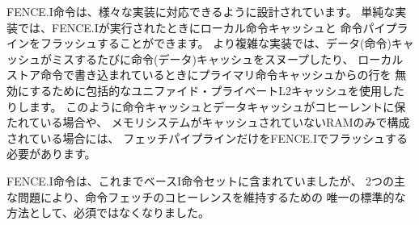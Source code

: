 \begin{commentary}
\begin{comment}
The FENCE.I instruction was designed to support a wide variety of
implementations.  A simple implementation can flush the local
instruction cache and the instruction pipeline when the FENCE.I is
executed.  A more complex implementation might snoop the instruction
(data) cache on every data (instruction) cache miss, or use an
inclusive unified private L2 cache to invalidate lines from the
primary instruction cache when they are being written by a local store
instruction.  If instruction and data caches are kept coherent in this
way, or if the memory system consists of only uncached RAMs, then just
the fetch pipeline needs to be flushed at a FENCE.I.
\end{comment}

FENCE.I命令は、様々な実装に対応できるように設計されています。 
単純な実装では、FENCE.Iが実行されたときにローカル命令キャッシュと
命令パイプラインをフラッシュすることができます。 
より複雑な実装では、データ(命令)キャッシュがミスするたびに命令(データ)キャッシュをスヌープしたり、
ローカルストア命令で書き込まれているときにプライマリ命令キャッシュからの行を
無効にするために包括的なユニファイド・プライベートL2キャッシュを使用したりします。 
このように命令キャッシュとデータキャッシュがコヒーレントに保たれている場合や、
メモリシステムがキャッシュされていないRAMのみで構成されている場合には、
フェッチパイプラインだけをFENCE.Iでフラッシュする必要があります。

\begin{comment}
The FENCE.I instruction was previously part of the base I instruction
set.  Two main issues are driving moving this out of the mandatory
base, although at time of writing it is still the only standard method
for maintaining instruction-fetch coherence.
\end{comment}

FENCE.I命令は、これまでベースI命令セットに含まれていましたが、
2つの主な問題により、命令フェッチのコヒーレンスを維持するための
唯一の標準的な方法として、必須ではなくなりました。

\begin{comment}
First, it has been recognized that on some systems, FENCE.I will be
expensive to implement and alternate mechanisms are being discussed in
the memory model task group.  In particular, for designs that have an
incoherent instruction cache and an incoherent data cache, or where
the instruction cache refill does not snoop a coherent data cache,
both caches must be completely flushed when a FENCE.I instruction is
encountered.  This problem is exacerbated when there are multiple
levels of I and D cache in front of a unified cache or outer memory
system.
\end{comment}


\end{commentary}
